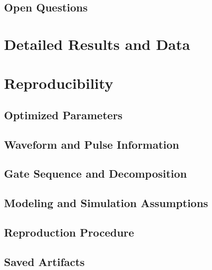 \documentclass[aps,pra,twocolumn,reprint,amsmath,amssymb]{revtex4-2}
\begin{document}
\subsection{Open Questions}




\appendix

\section{Detailed Results and Data}

\section{Reproducibility}

\subsection{Optimized Parameters}

\subsection{Waveform and Pulse Information}

\subsection{Gate Sequence and Decomposition}

\subsection{Modeling and Simulation Assumptions}

\subsection{Reproduction Procedure}

\subsection{Saved Artifacts}
\end{document}
